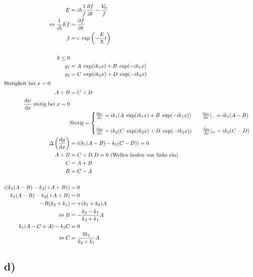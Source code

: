     \begin{align*}
        E &= i\hbar \frac{1}{f} \frac{\partial f}{\partial t} - \frac{V_0}{f}\\
        \Leftrightarrow \frac{1}{i\hbar} Ef &= \frac{\partial f}{\partial t}\\
        f &= c \; \exp \left( -\frac{E}{\hbar}t \right)\\
        \\
        k \leq 0\\
        g_1 &= A \; \exp(ik_1x) + B \; \exp(-ik_1x)\\
        g_2 &= C \; \exp(ik_2x) + D \; \exp(-ik_2x)\\
        \intertext{Stetigkeit bei $x=0$
        }
        A + B &= C + D\\
        \frac{\mathrm{d}\psi}{\mathrm{d}x} \; \text{stetig bei $x=0$}\\
        &\text{Stetig}=\begin{cases}
            \frac{\mathrm{d} g_1}{\mathrm{d}x} = ik_1 (A\;\exp(ik_1x) + B\;\exp(-ik_1x)) \qquad \frac{\mathrm{d} g_1}{\mathrm{d}x} \vert_{-} = ik_1(A-B)\\
            \\
            \frac{\mathrm{d} g_2}{\mathrm{d}x} = ik_2 (C\;\exp(ik_2x) + D\;\exp(-ik_2x)) \qquad \frac{\mathrm{d} g_2}{\mathrm{d}x} \vert_{+} = ik_2(C-D)
        \end{cases}\\
        \Delta \left( \frac{\mathrm{d} g}{\mathrm{d}x} \right) &= i(k_1(A-B) -k_2(C-D)) =0\\
        A+B &= C+D \; \text{$D=0$ (Wellen laufen von links ein)}\\
        C &= A+B\\
        B &= C-A\\
        \\
        i(k_1(A-B) - k_2(+A+B)) &=0\\
        k_1(A-B) - k_2(+A+B) &=0\\
        -B(k_2+k_1) &= +(k_1+k_2)A\\
        \Leftrightarrow B &= -\frac{k_2-k_1}{k_2+k_1}A\\
        k_1(A-C+A)-k_2C &= 0\\
        \Leftrightarrow C &= \frac{2k_1}{k_2+k_1}A
    \end{align*}

\subsection{d)}

